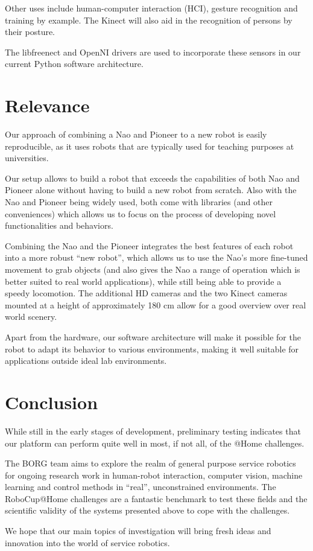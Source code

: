 \documentclass[runningheads,a4paper]{llncs}
\begin{document}
Other uses include human-computer interaction (HCI), gesture recognition and training by example. 
The Kinect will also aid in the recognition of persons by their posture.

The libfreenect and OpenNI drivers are used to incorporate these sensors in our current Python software architecture.

\section{Relevance}

Our approach of combining a Nao and Pioneer to a new robot is easily reproducible, as it uses robots that are typically used for teaching purposes at universities.

Our setup allows to build a robot that exceeds the capabilities of both Nao and Pioneer alone without having to build a new robot from scratch.
Also with the Nao and Pioneer being widely used, both come with libraries (and other conveniences) which allows us to focus on the process of developing novel functionalities and behaviors.

Combining the Nao and the Pioneer integrates the best features of each robot into a more robust ``new robot'', which allows us to use the Nao's more fine-tuned movement to grab objects (and also gives the Nao a range of operation which is better suited to real world applications), while still being able to provide a speedy locomotion.
The additional HD cameras and the two Kinect cameras mounted at a height of approximately 180 cm allow for a good overview over real world scenery.

Apart from the hardware, our software architecture will make it possible for the robot to adapt its behavior to various environments, making it well suitable for applications outside ideal lab environments.


\section{Conclusion}
While still in the early stages of development, preliminary testing indicates that our platform can perform quite well in most, if not all, of the @Home challenges. 

The BORG team aims to explore the realm of general purpose service robotics for ongoing research work in human-robot interaction, computer vision, machine learning and control methods in ``real'', unconstrained environments.
The RoboCup@Home challenges are a fantastic benchmark to test these fields and the scientific validity of the systems presented above to cope with the challenges.

We hope that our main topics of investigation will bring fresh ideas and innovation into the world of service robotics.


{}
\end{document}
